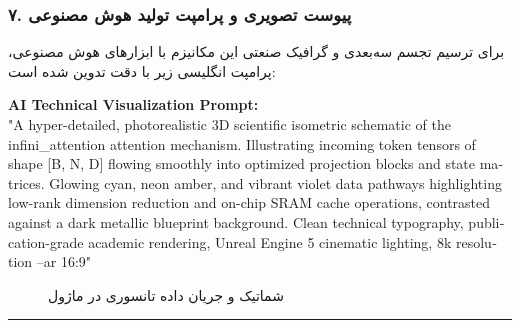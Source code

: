 \subsubsection*{۷. پیوست تصویری و پرامپت تولید هوش مصنوعی}
برای ترسیم تجسم سه‌بعدی و گرافیک صنعتی این مکانیزم با ابزارهای هوش مصنوعی، پرامپت انگلیسی زیر با دقت تدوین شده است:

\vspace{0.2cm}
\begin{latin}
\footnotesize
\textbf{AI Technical Visualization Prompt:}\\
"A hyper-detailed, photorealistic 3D scientific isometric schematic of the infini\_attention attention mechanism. Illustrating incoming token tensors of shape [B, N, D] flowing smoothly into optimized projection blocks and state matrices. Glowing cyan, neon amber, and vibrant violet data pathways highlighting low-rank dimension reduction and on-chip SRAM cache operations, contrasted against a dark metallic blueprint background. Clean technical typography, publication-grade academic rendering, Unreal Engine 5 cinematic lighting, 8k resolution --ar 16:9"
\end{latin}

\begin{figure}[H]
    \centering
    \caption{شماتیک و جریان داده تانسوری در ماژول }
    \label{fig:infini_attention}
\end{figure}

\vspace{0.5cm}
\hrule
\vspace{0.5cm}
